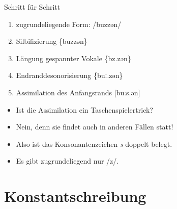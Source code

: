 \begin{frame}
  {Schritt für Schritt}
  \pause
  \begin{enumerate}[<+->]
    \item zugrundeliegende Form: \alert{/buzzən/}
    \item Silbifizierung \phopro \{buzzən\}
    \item Längung gespannter Vokale \phopro \{bz.zən\}
    \item Endranddesonorisierung \phopro \{buː.zən\}
    \item Assimilation des Anfangsrands \phopro \alert{[buːs.}\alert{ən]}
  \end{enumerate}
  \pause
  \begin{itemize}[<+->]
    \item Ist die Assimilation ein Taschenspielertrick?
    \item Nein, denn sie findet auch in anderen Fällen statt!
  \end{itemize}
  \pause
  \begin{exe}
    \ex\label{ex:dehnungsundschaerfungsschreibungen024}
    \begin{xlist}
      \pause
    \end{xlist}
  \end{exe}
  \pause
  \begin{itemize}[<+->]
    \item Also ist das Konsonantenzeichen \textit{s}  doppelt belegt.
    \item \alert{Es gibt zugrundeliegend nur /z/.}
  \end{itemize}
\end{frame}


\section[Konstanz]{Konstantschreibung}

